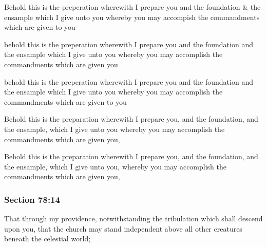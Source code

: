 		\begin{framed}
		\scriptsize
			\begin{compactdesc}
				\item[JSP] Behold this is the preperation wherewith I prepare you and the foundation \& the ensample which I give unto you whereby you may accompish the commandments which are given to you
				\item[RB1] behold this is the preperation wherewith I prepare you and the foundation and the ensample which I give unto you whereby you may accomplish the commandments which are given you
				\item[RB2] behold this is the preperation wherewith I prepare you and the foundation and the ensample which I give unto you whereby you may accomplish the commandments which are given to you
				\item[DC 1835] Behold this is the preparation wherewith I prepare you, and the foundation, and the ensample, which I give unto you whereby you may accomplish the commandments which are given you,
				\item[DC 1844] Behold this is the preparation wherewith I prepare you, and the foundation, and the ensample, which I give unto you, whereby you may accomplish the commandments which are given you,
			\end{compactdesc}
		\end{framed}

	\subsubsection{Section 78:14} %
		\label{DC78-14}

		That through my providence, notwithstanding the tribulation which shall descend upon you, that the church may stand independent above all other creatures beneath the celestial world;

